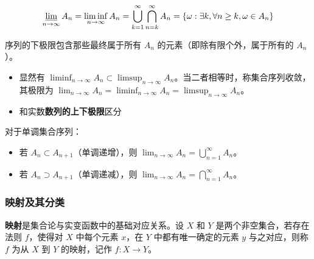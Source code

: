 \begin{definition}[集合的下极限]

$$
\displaystyle  \varliminf_{n \to \infty} A_n=\liminf_{n \to \infty} A_n = \bigcup_{k=1}^{\infty} \bigcap_{n=k}^{\infty} A_n=\lbrace \omega: \exists k, \forall n \ge k, \omega \in A_n \rbrace
$$

序列的下极限包含那些最终属于所有 $A_n$ 的元素（即除有限个外，属于所有的 $A_n$）。

\end{definition}

\begin{itemize}
  \item {显然有 $\displaystyle \liminf_{n \to \infty} A_n \subset \limsup_{n \to \infty} A_n$。当二者相等时，称集合序列收敛，其极限为 $\displaystyle \lim_{n \to \infty} A_n = \liminf_{n \to \infty} A_n = \limsup_{n \to \infty} A_n$。}\item {和实数\textbf{数列的上下极限}区分}
\end{itemize}

\begin{theorem}

对于单调集合序列：

\begin{itemize}
  \item {若 $A_n \subset A_{n+1}$（单调递增），则 $\displaystyle \lim_{n \to \infty} A_n = \bigcup_{n=1}^{\infty} A_n$。}\item {若 $A_n \supset A_{n+1}$（单调递减），则 $\displaystyle \lim_{n \to \infty} A_n = \bigcap_{n=1}^{\infty} A_n$。}
\end{itemize}

\end{theorem}

\subsubsection{映射及其分类}

\textbf{映射}是集合论与实变函数中的基础对应关系。设 $\displaystyle X$ 和 $\displaystyle Y$ 是两个非空集合，若存在法则 $\displaystyle f$，使得对 $\displaystyle X$ 中每个元素 $\displaystyle x$，在 $\displaystyle Y$ 中都有唯一确定的元素 $\displaystyle y$ 与之对应，则称 $\displaystyle f$ 为从 $\displaystyle X$ 到 $\displaystyle Y$ 的映射，记作 $\displaystyle f: X \to Y$。

